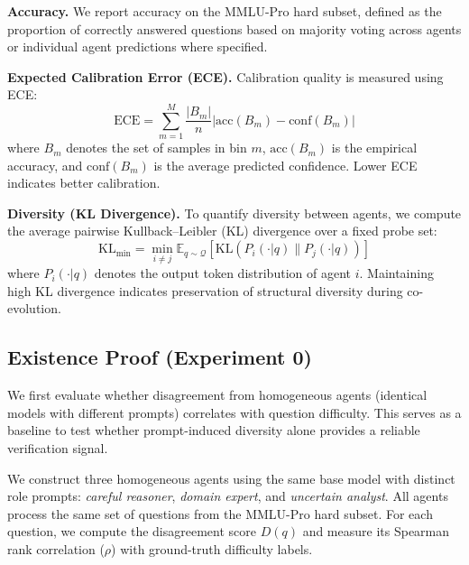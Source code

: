 \documentclass{article}
\begin{document}
\textbf{Accuracy.} We report accuracy on the MMLU-Pro hard subset, defined as the proportion of correctly answered questions based on majority voting across agents or individual agent predictions where specified.

\textbf{Expected Calibration Error (ECE).} Calibration quality is measured using ECE:
\begin{equation}
\mathrm{ECE} = \sum_{m=1}^{M} \frac{|B_m|}{n} \left| \mathrm{acc}(B_m) - \mathrm{conf}(B_m) \right|
\end{equation}
where $B_m$ denotes the set of samples in bin $m$, $\mathrm{acc}(B_m)$ is the empirical accuracy, and $\mathrm{conf}(B_m)$ is the average predicted confidence. Lower ECE indicates better calibration.

\textbf{Diversity (KL Divergence).} To quantify diversity between agents, we compute the average pairwise Kullback–Leibler (KL) divergence over a fixed probe set:
\begin{equation}
\mathrm{KL}_{\text{min}} = \min_{i \neq j} \mathbb{E}_{q \sim \mathcal{Q}} \left[ \mathrm{KL}(P_i(\cdot|q) \parallel P_j(\cdot|q)) \right]
\end{equation}
where $P_i(\cdot|q)$ denotes the output token distribution of agent $i$. Maintaining high KL divergence indicates preservation of structural diversity during co-evolution.

\subsection{Existence Proof (Experiment 0)}

We first evaluate whether disagreement from homogeneous agents (identical models with different prompts) correlates with question difficulty. This serves as a baseline to test whether prompt-induced diversity alone provides a reliable verification signal.

We construct three homogeneous agents using the same base model with distinct role prompts: \textit{careful reasoner}, \textit{domain expert}, and \textit{uncertain analyst}. All agents process the same set of questions from the MMLU-Pro hard subset. For each question, we compute the disagreement score $D(q)$ and measure its Spearman rank correlation ($\rho$) with ground-truth difficulty labels.
\end{document}
